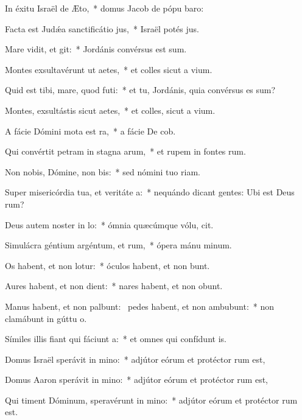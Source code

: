 \item In éxitu Israël de Æto,~* domus Jacob de pópu baro:
\item Facta est Judǽa sanctificátio jus,~* Israël potés jus.
\item Mare vidit, et git:~* Jordánis convérsus est sum.
\item Montes exsultavérunt ut aetes,~* et colles sicut a vium.
\item Quid est tibi, mare, quod futi:~* et tu, Jordánis, quia convérsus es sum?
\item Montes, exsultástis sicut aetes,~* et colles, sicut a vium.
\item A fácie Dómini mota est ra,~* a fácie De cob.
\item Qui convértit petram in stagna arum,~* et rupem in fontes rum.
\item Non nobis, Dómine, non bis:~* sed nómini tuo  riam.
\item Super misericórdia tua, et veritáte a:~* nequándo dicant gentes: Ubi est Deus rum?
\item Deus autem noster in lo:~* ómnia quæcúmque vólu, cit.
\item Simulácra géntium argéntum, et rum,~* ópera mánu minum.
\item Os habent, et non lotur:~* óculos habent, et non bunt.
\item Aures habent, et non dient:~* nares habent, et non obunt.
\item Manus habent, et non palbunt:~\pscross{} pedes habent, et non ambubunt:~* non clamábunt in gúttu o.
\item Símiles illis fiant qui fáciunt a:~* et omnes qui confídunt  is.
\item Domus Israël sperávit in mino:~* adjútor eórum et protéctor rum est,
\item Domus Aaron sperávit in mino:~* adjútor eórum et protéctor rum est,
\item Qui timent Dóminum, speravérunt in mino:~* adjútor eórum et protéctor rum est.
